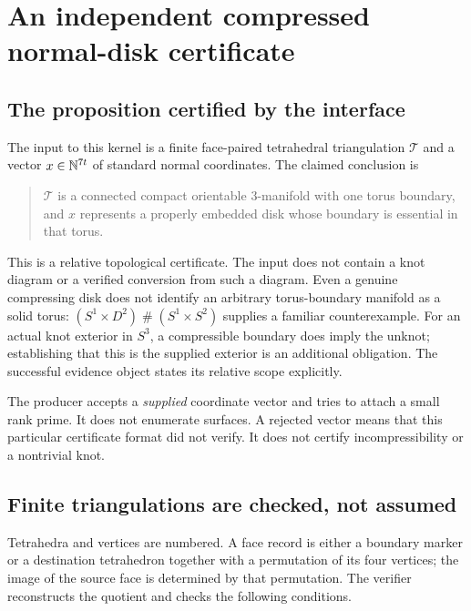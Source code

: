 \section{An independent compressed normal-disk certificate}
\label{sec:normal}

\subsection{The proposition certified by the interface}

The input to this kernel is a finite face-paired tetrahedral triangulation
$\mathcal T$ and a vector $x\in\mathbb N^{7t}$ of standard normal coordinates.
The claimed conclusion is
\begin{quote}
$\mathcal T$ is a connected compact orientable $3$-manifold with one torus
boundary, and $x$ represents a properly embedded disk whose boundary is
essential in that torus.
\end{quote}
This is a relative topological certificate. The input does not contain a knot
diagram or a verified conversion from such a diagram. Even a genuine
compressing disk does not identify an arbitrary torus-boundary manifold as a
solid torus: $(S^1\times D^2)\mathbin{\#}(S^1\times S^2)$ supplies a familiar
counterexample. For an actual knot exterior in $S^3$, a compressible boundary
does imply the unknot; establishing that this is the supplied exterior is an
additional obligation. The successful evidence object states its relative
scope explicitly.

The producer accepts a \emph{supplied} coordinate vector and tries to attach
a small rank prime. It does not enumerate surfaces. A rejected vector means
that this particular certificate format did not verify. It does not certify
incompressibility or a nontrivial knot.

\subsection{Finite triangulations are checked, not assumed}

Tetrahedra and vertices are numbered. A face record is either a boundary
marker or a destination tetrahedron together with a permutation of its four
vertices; the image of the source face is determined by that permutation.
The verifier reconstructs the quotient and checks the following conditions.

